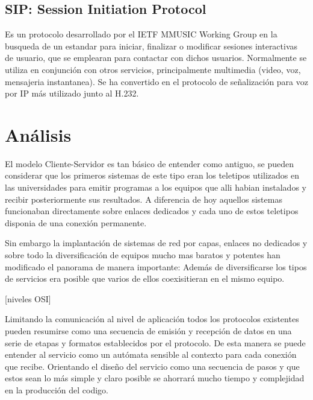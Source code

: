 \documentclass[a4paper,spanish,12pt]{book}
\begin{document}
\section{SIP: Session Initiation Protocol} 
Es un protocolo desarrollado por el IETF MMUSIC Working Group en la busqueda de un estandar para iniciar, finalizar o modificar sesiones interactivas de usuario, que se emplearan para contactar con dichos usuarios. Normalmente se utiliza en conjunción con otros servicios, principalmente multimedia (video, voz, mensajeria instantanea). Se ha convertido en el protocolo de señalización para voz por IP más utilizado junto al H.232.

\chapter{Análisis}
El modelo Cliente-Servidor es tan básico de entender como antiguo, se pueden considerar que los primeros sistemas de este tipo eran los teletipos utilizados en las universidades para emitir programas a los equipos que alli habian instalados y recibir posteriormente sus resultados. A diferencia de hoy aquellos sistemas funcionaban directamente sobre enlaces dedicados y cada uno de estos teletipos disponia de una conexión permanente.

Sin embargo la implantación de sistemas de red por capas, enlaces no dedicados y sobre todo la diversificación de equipos mucho mas baratos y potentes han modificado el panorama de manera importante: Además de diversificarse los tipos de servicios era posible que varios de ellos coexisitieran en el mismo equipo.

[niveles OSI]

Limitando la comunicación al nivel de aplicación todos los protocolos existentes pueden resumirse como una secuencia de emisión y recepción de datos en una serie de etapas y formatos establecidos por el protocolo. 
De esta manera se puede entender al servicio como un autómata sensible al contexto para cada conexión que recibe. Orientando el diseño del servicio como una secuencia de pasos y que estos sean lo más simple y claro posible se ahorrará mucho tiempo y complejidad en la producción del codigo. 
\end{document}
